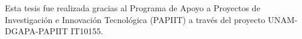 Esta tesis fue realizada gracias al Programa de Apoyo a Proyectos de Investigación e Innovación Tecnológica (PAPIIT) a través del proyecto UNAM-DGAPA-PAPIIT IT10155.